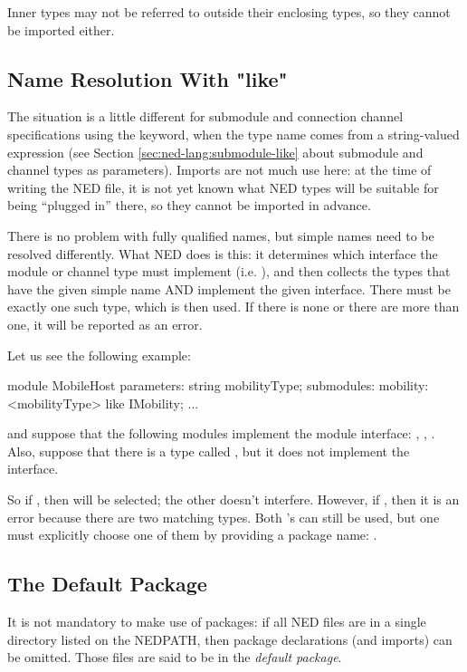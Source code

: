 Inner types may not be referred to outside their enclosing types, so they cannot
be imported either.


\subsection{Name Resolution With "like"}
\label{sec:ned-lang:name-resolution-with-like}

The situation is a little different for submodule and connection channel
specifications using the  keyword, when the type name comes from
a string-valued expression (see Section \ref{sec:ned-lang:submodule-like} about
submodule and channel types as parameters). Imports are not much use here: at
the time of writing the NED file, it is not yet known what NED types will be
suitable for being ``plugged in'' there, so they cannot be imported in advance.

There is no problem with fully qualified names, but simple names need to be
resolved differently. What NED does is this: it determines which interface the
module or channel type must implement (i.e. ), and then
collects the types that have the given simple name AND implement the given
interface. There must be exactly one such type, which is then used. If there is
none or there are more than one, it will be reported as an error.

Let us see the following example:

\begin{ned}
module MobileHost
{
    parameters:
        string mobilityType;
    submodules:
        mobility: <mobilityType> like IMobility;
        ...
}
\end{ned}

and suppose that the following modules implement the  module
interface: , ,
. Also, suppose that there is a type called
, but it does not implement the interface.

So if , then 
will be selected; the other  doesn't interfere. However, if
, then it is an error because there are two
matching  types. Both 's can still be used, but
one must explicitly choose one of them by providing a package name:
.


\subsection{The Default Package}
\label{sec:ned-lang:default-package}

It is not mandatory to make use of packages: if all NED files are in a single
directory listed on the NEDPATH, then package declarations (and imports) can be
omitted. Those files are said to be in the \textit{default package}.







